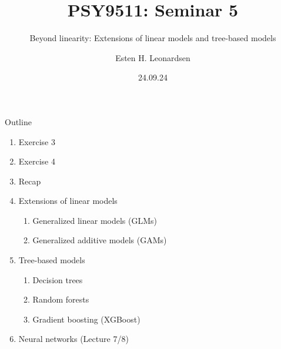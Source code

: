 \documentclass{beamer}
\title{PSY9511: Seminar 5}
\subtitle{Beyond linearity: Extensions of linear models and tree-based models}
\author{Esten H. Leonardsen}
\date{24.09.24}
\begin{document}
	\begin{frame}
	 	\maketitle
	\end{frame}

    \begin{frame}{Outline}
        \begin{enumerate}
            \item Exercise 3
            \item Exercise 4
            \item Recap
            \item Extensions of linear models
            \begin{enumerate}
                \item Generalized linear models (GLMs)
                \item Generalized additive models (GAMs)
            \end{enumerate}
            \item Tree-based models
            \begin{enumerate}
                \item Decision trees
                \item Random forests
                \item Gradient boosting (XGBoost)
            \end{enumerate}
            \item Neural networks (Lecture 7/8)
        \end{enumerate}
    \end{frame}

    
    
    
    
\end{document}
